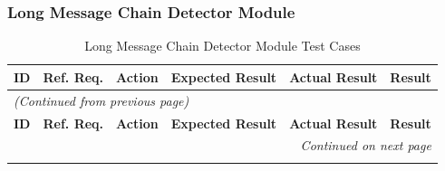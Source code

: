 \documentclass[12pt, titlepage]{article}
\begin{document}
\subsubsection{Long Message Chain Detector Module}

\begin{longtable}{c
    >{\raggedright\arraybackslash}p{1.5cm}
    >{\raggedright\arraybackslash}p{4.5cm}
    >{\raggedright\arraybackslash}p{4cm}
  >{\raggedright\arraybackslash}p{3cm} c}
  \toprule
  \textbf{ID} & \textbf{Ref. Req.} & \textbf{Action} &
  \textbf{Expected Result} & \textbf{Actual Result} & \textbf{Result} \\
  \midrule
  \endfirsthead

  \multicolumn{6}{l}{\textit{(Continued from previous page)}} \\
  \toprule
  \textbf{ID} & \textbf{Ref. Req.} & \textbf{Action} &
  \textbf{Expected Result} & \textbf{Actual Result} & \textbf{Result} \\
  \midrule
  \endhead

  \multicolumn{6}{r}{\textit{Continued on next page}} \\
  \endfoot

  \bottomrule
  \caption{Long Message Chain Detector Module Test Cases}
  \label{table:lmc_tests}
  \endlastfoot


\end{longtable}
\end{document}
